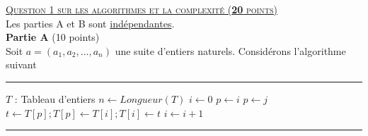 %
%

\noindent
{\textsc{\underline{Question 1 sur les algorithmes et la complexit\'e (\textbf{20} points)}}} %
\\

Les parties A et B sont \underline{ind\'ependantes}.\\

\textbf{Partie A} (10 points)\\



Soit $a = (a_1, a_2, ..., a_n)$ une suite d'entiers naturels. Consid\'erons l'algorithme suivant




\rule{0.8\textwidth}{0.4mm}
            \begin{algorithmic}[1]
                 {$T$ : Tableau d'entiers} 
                    \State $n \gets Longueur(T)$
                    \State $i \gets 0 $
                       \State $p \gets i$
                            {$p\gets j$}\EndIf
                        \EndFor
                        \State $t\gets T[p] ; T[p] \gets T[i] ; T[i] \gets t$
                        \State $i \gets i+1$
                    \EndWhile
                \EndProcedure
            \end{algorithmic}
\rule{0.8\textwidth}{0.4mm}

